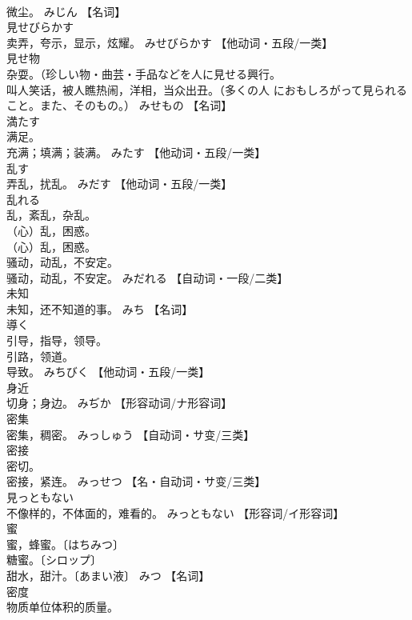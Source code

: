 \documentclass[8pt]{extreport}
\begin{document}
\begin{CJK}{UTF8}{min}
\\	微尘。	みじん		【名词】
\\	見せびらかす	
\\	卖弄，夸示，显示，炫耀。	みせびらかす		【他动词・五段/一类】
\\	見せ物	
\\	杂耍。（珍しい物・曲芸・手品などを人に見せる興行。 
\\	叫人笑话，被人瞧热闹，洋相，当众出丑。（多くの人 におもしろがって見られること。また、そのもの。）	みせもの		【名词】
\\	満たす	
\\	满足。 
\\	充满；填满；装满。	みたす		【他动词・五段/一类】
\\	乱す	
\\	弄乱，扰乱。	みだす		【他动词・五段/一类】
\\	乱れる	
\\	乱，紊乱，杂乱。 
\\	（心）乱，困惑。 
\\	（心）乱，困惑。 
\\	骚动，动乱，不安定。 
\\	骚动，动乱，不安定。	みだれる		【自动词・一段/二类】
\\	未知	
\\	未知，还不知道的事。	みち		【名词】
\\	導く	
\\	引导，指导，领导。 
\\	引路，领道。 
\\	导致。	みちびく		【他动词・五段/一类】
\\	身近	
\\	切身；身边。	みぢか		【形容动词/ナ形容词】
\\	密集	
\\	密集，稠密。	みっしゅう		【自动词・サ变/三类】
\\	密接	
\\	密切。 
\\	密接，紧连。	みっせつ		【名・自动词・サ变/三类】
\\	見っともない	
\\	不像样的，不体面的，难看的。	みっともない		【形容词/イ形容词】
\\	蜜	
\\	蜜，蜂蜜。〔はちみつ〕 
\\	糖蜜。〔シロップ〕 
\\	甜水，甜汁。〔あまい液〕	みつ		【名词】
\\	密度	
\\	物质单位体积的质量。 

\end{CJK}
\end{document}

